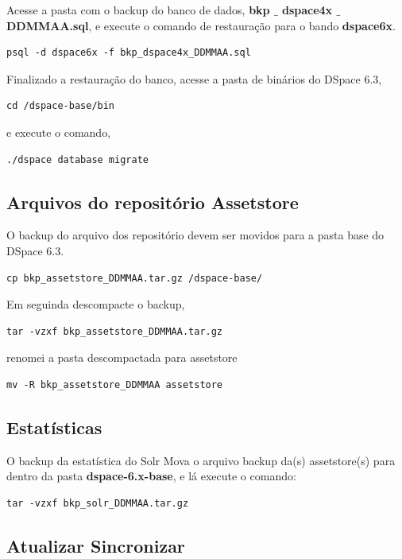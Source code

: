 \documentclass[12pt,hidelinks]{article}
\begin{document}
Acesse a pasta com o backup do banco de dados, \textbf{bkp $\_$ dspace4x $\_$ DDMMAA.sql}, e execute o comando de restauração para o bando \textbf{dspace6x}.

\begin{verbatim}
psql -d dspace6x -f bkp_dspace4x_DDMMAA.sql
\end{verbatim}

Finalizado a restauração do banco, acesse a pasta de binários do DSpace 6.3,
\begin{verbatim}
cd /dspace-base/bin
\end{verbatim}
e execute o comando,
\begin{verbatim}
./dspace database migrate
\end{verbatim}

\newpage
\subsection{Arquivos do repositório Assetstore}

O backup do arquivo dos repositório devem ser movidos para a pasta base do DSpace 6.3.
\begin{verbatim}
cp bkp_assetstore_DDMMAA.tar.gz /dspace-base/
\end{verbatim}
Em seguinda descompacte o backup,
\begin{verbatim}
tar -vzxf bkp_assetstore_DDMMAA.tar.gz
\end{verbatim}
renomei a pasta descompactada para assetstore
\begin{verbatim}
mv -R bkp_assetstore_DDMMAA assetstore 
\end{verbatim}


\subsection{Estatísticas}

O backup da estatística do Solr
\textbullet \hspace{6pt} Mova o arquivo backup da(s) assetstore(s) para dentro da pasta \textbf{dspace-6.x-base}, e lá execute o comando:

\begin{verbatim}
tar -vzxf bkp_solr_DDMMAA.tar.gz
\end{verbatim}

\subsection{Atualizar Sincronizar}
\end{document}
